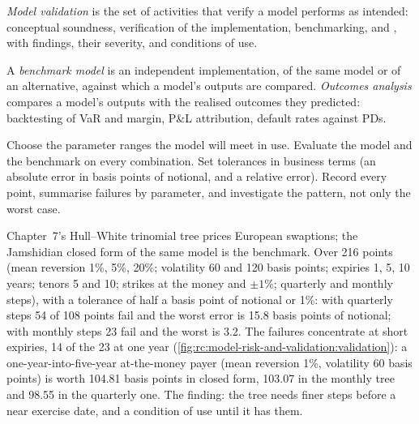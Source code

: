 \begin{definition}\label{def:rc:model-risk-and-validation:validation}
\emph{Model validation} is the set of activities that verify a model performs
as intended: conceptual soundness, verification of the implementation, benchmarking, and , with findings, their severity, and conditions of use.
\end{definition}

\begin{definition}\label{def:rc:model-risk-and-validation:bench}
A \emph{benchmark model} is an independent implementation, of the same
model or of an alternative, against which a model's outputs are compared. \emph{Outcomes
analysis} compares a model's outputs with the realised outcomes they
predicted: backtesting of VaR and margin, P\&L attribution, default rates against PDs.
\end{definition}

\begin{method}\label{met:rc:model-risk-and-validation:grid}
Choose the parameter ranges the model will meet in use. Evaluate the model and the benchmark on
every combination. Set tolerances in business terms (an absolute error in basis points of notional,
and a relative error). Record every point, summarise failures by parameter, and investigate the
pattern, not only the worst case.
\end{method}

\label{lst:rc:model-risk-and-validation:bench}

\begin{example}\label{ex:rc:model-risk-and-validation:tree}
Chapter~7's Hull--White trinomial tree prices European swaptions; the Jamshidian closed form of the
same model is the benchmark. Over 216 points (mean reversion 1\%, 5\%, 20\%; volatility 60 and 120
basis points; expiries 1, 5, 10 years; tenors 5 and 10; strikes at the money and $\pm1\%$; quarterly and
monthly steps), with a tolerance of half a basis point of notional or 1\%: with quarterly steps 54 of 108
points fail and the worst error is 15.8 basis points of notional; with monthly steps 23 fail and the worst
is 3.2. The failures concentrate at short expiries, 14 of the 23 at one year
(\cref{fig:rc:model-risk-and-validation:validation}): a one-year-into-five-year at-the-money payer
(mean reversion 1\%, volatility 60 basis points) is worth 104.81 basis points in closed form, 103.07 in the
monthly tree and 98.55 in the quarterly one. The finding: the tree needs finer steps before a near
exercise date, and a condition of use until it has them.
\end{example}

